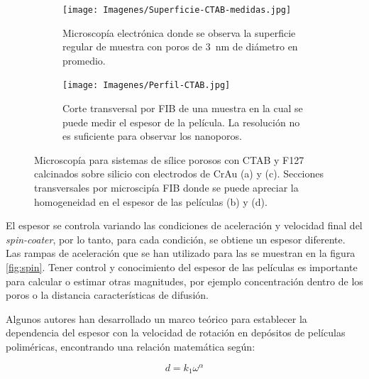 \begin{figure}[bh!]
\begin{subfigure}[t]{0.495\textwidth}
			       		\label{fig:sem_homogeneidad2}
			       		\end{subfigure}	
			       	\begin{subfigure}[t]{0.495\textwidth}
			        	\texttt{[image: Imagenes/Superficie-CTAB-medidas.jpg]}
			       		\caption{Microscopía electrónica donde se observa la superficie regular de muestra \pdmC\space con poros de \SI{3}{nm} de diámetro en promedio.}
			       		\label{fig:sem_homogeneidad3}
			       		\end{subfigure}
					\begin{subfigure}[t]{0.49\textwidth}
			 	   	    \texttt{[image: Imagenes/Perfil-CTAB.jpg]}
			       		\caption{Corte transversal por FIB de una muestra \pdmC\space en la cual se puede medir el espesor de la película. La resolución no es suficiente para observar los nanoporos.}
			       		\label{fig:sem_homogeneidad4}
			       		\end{subfigure}	
					
					\vspace{-2mm}
					 \caption[MEB \pdmC\space y \pdmF.]{Microscopía para sistemas de sílice porosos con CTAB y F127 calcinados sobre silicio con electrodos de Cr\textbar Au (a) y (c). Secciones transversales por microscipía FIB donde se puede apreciar la homogeneidad en el espesor de las películas (b) y (d).}
					 \label{fig:sem_homogeneidad}	
				     \vspace*{0.2cm}
				     \end{figure}
 	
		 El espesor se controla variando las condiciones de aceleración y velocidad final del \textit{spin-coater}, por lo tanto, para cada condición, se obtiene un espesor diferente. Las rampas de aceleración que se han utilizado para las \pdm\space se muestran en la figura \ref{fig:spin}. Tener control y conocimiento del espesor de las películas es importante para calcular o estimar otras magnitudes, por ejemplo concentración dentro de los poros o la distancia características de difusión. 

		 Algunos autores han desarrollado un marco teórico para establecer la dependencia del espesor con la velocidad de rotación en depósitos de películas poliméricas, encontrando una relación matemática según: \cite{Norrman2005,Meyerhofer1978,Bornside1989,Lora1990}
	
			\begin{equation}
			  d = k_1 \omega^{\alpha}
			  \label{eq:spin_meso}
			  \end{equation}		
	
